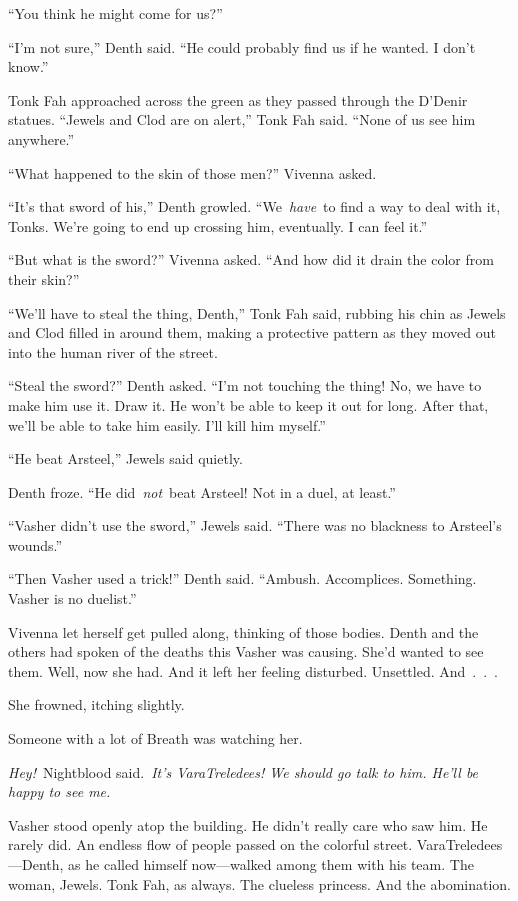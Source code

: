 “You think he might come for us?”

“I’m not sure,” Denth said. “He could probably find us if he wanted. I don’t know.”

Tonk Fah approached across the green as they passed through the D’Denir statues. “Jewels and Clod are on alert,” Tonk Fah said. “None of us see him anywhere.”

“What happened to the skin of those men?” Vivenna asked.

“It’s that sword of his,” Denth growled. “We~\textit{have}~to find a way to deal with it, Tonks. We’re going to end up crossing him, eventually. I can feel it.”

“But what is the sword?” Vivenna asked. “And how did it drain the color from their skin?”

“We’ll have to steal the thing, Denth,” Tonk Fah said, rubbing his chin as Jewels and Clod filled in around them, making a protective pattern as they moved out into the human river of the street.

“Steal the sword?” Denth asked. “I’m not touching the thing! No, we have to make him use it. Draw it. He won’t be able to keep it out for long. After that, we’ll be able to take him easily. I’ll kill him myself.”

“He beat Arsteel,” Jewels said quietly.

Denth froze. “He did~\textit{not}~beat Arsteel! Not in a duel, at least.”

“Vasher didn’t use the sword,” Jewels said. “There was no blackness to Arsteel’s wounds.”

“Then Vasher used a trick!” Denth said. “Ambush. Accomplices. Something. Vasher is no duelist.”

Vivenna let herself get pulled along, thinking of those bodies. Denth and the others had spoken of the deaths this Vasher was causing. She’d wanted to see them. Well, now she had. And it left her feeling disturbed. Unsettled. And~.~.~.

She frowned, itching slightly.

Someone with a lot of Breath was watching her.

\orn

\textit{Hey!}~Nightblood said.~\textit{It’s VaraTreledees! We should go talk to him. He’ll be happy to see me.}

Vasher stood openly atop the building. He didn’t really care who saw him. He rarely did. An endless flow of people passed on the colorful street. VaraTreledees—Denth, as he called himself now—walked among them with his team. The woman, Jewels. Tonk Fah, as always. The clueless princess. And the abomination.

